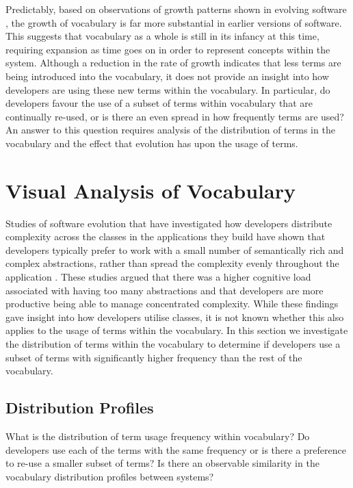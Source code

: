 Predictably, based on observations of growth patterns shown in evolving software \cite{Lehman97a, Paulson04a, Madhavji06a, Mens08b}, the growth of vocabulary is far more substantial in earlier versions of software. This suggests that vocabulary as a whole is still in its infancy at this time, requiring expansion as time goes on in order to represent concepts within the system. Although a reduction in the rate of growth indicates that less terms are being introduced into the vocabulary, it does not provide an insight into how developers are using these new terms within the vocabulary. In particular, do developers favour the use of a subset of terms within vocabulary that are continually re-used, or is there an even spread in how frequently terms are used? An answer to this question requires analysis of the distribution of terms in the vocabulary and the effect that evolution has upon the usage of terms.


\section{Visual Analysis of Vocabulary} %
\label{sec:visual_analysis_of_vocabulary}

Studies of software evolution that have investigated how developers distribute complexity across the classes in the applications they build have shown that developers typically prefer to work with a small number of semantically rich and complex abstractions, rather than spread the complexity evenly throughout the application \cite{Vasa09a}. These studies argued that there was a higher cognitive load associated with having too many abstractions and that developers are more productive being able to manage concentrated complexity. While these findings gave insight into how developers utilise classes, it is not known whether this also applies to the usage of terms within the vocabulary. In this section we investigate the distribution of terms within the vocabulary to determine if developers use a subset of terms with significantly higher frequency than the rest of the vocabulary.

\subsection{Distribution Profiles} %
\label{sub:distribution_profiles}

What is the distribution of term usage frequency within vocabulary? Do developers use each of the terms with the same frequency or is there a preference to re-use a smaller subset of terms? Is there an observable similarity in the vocabulary distribution profiles between systems?

